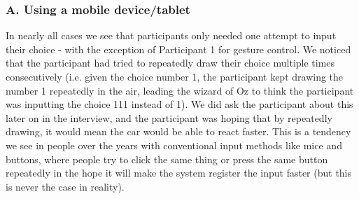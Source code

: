 \documentclass{sigchi}
\begin{document}
\subsubsection{A. Using a mobile device/tablet}

\begin{table}[H] %
\centering
\caption{Number of attempts by each participant for each input method, when using a mobile device/tablet to read when a request to intervene was issued}
\label{table:attemptsMobilePhone}
\end{table}
 
In nearly all cases we see that participants only needed one attempt to input their choice - with the exception of Participant 1 for gesture control. We noticed that the participant had tried to repeatedly draw their choice multiple times consecutively (i.e. given the choice number 1, the participant kept drawing the number 1 repeatedly in the air, leading the wizard of Oz to think the participant was inputting the choice 111 instead of 1). We did ask the participant about this later on in the interview, and the participant was hoping that by repeatedly drawing, it would mean the car would be able to react faster. This is a tendency we see in people over the years with conventional input methods like mice and buttons, where people try to click the same thing or press the same button repeatedly in the hope it will make the system register the input faster (but this is never the case in reality).
\end{document}
